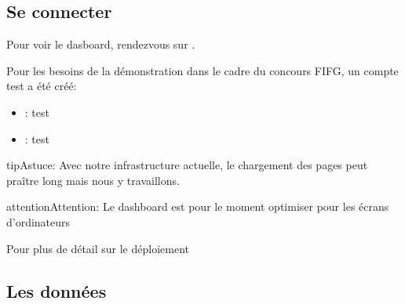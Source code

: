 \documentclass[letterpaper,10pt,french]{sphinxmanual}
\begin{document}
\subsection{Se connecter}
\label{\detokenize{intro:se-connecter}}
\sphinxAtStartPar
Pour voir le dasboard, rendez\sphinxhyphen{}vous sur  .

\sphinxAtStartPar
Pour les besoins de la démonstration dans le cadre du concours FIFG, un compte test a été créé:
\begin{itemize}
\item {} 
\sphinxAtStartPar
{}: test

\item {} 
\sphinxAtStartPar
{}: test

\end{itemize}

\begin{sphinxadmonition}{tip}{Astuce:}
\sphinxAtStartPar
Avec notre infrastructure actuelle, le chargement des pages peut praître long mais nous y travaillons.
\end{sphinxadmonition}

\begin{sphinxadmonition}{attention}{Attention:}
\sphinxAtStartPar
Le dashboard est pour le moment optimiser pour les écrans d’ordinateurs
\end{sphinxadmonition}

\sphinxAtStartPar
Pour plus de détail sur le déploiement {\hyperref[\detokenize{use:instal}]{}}


\subsection{Les données}
\label{\detokenize{intro:les-donnees}}
\end{document}
